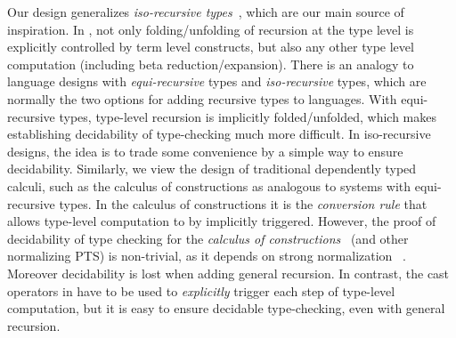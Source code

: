 Our design generalizes \emph{iso-recursive
  types}~\cite{tapl}, which are our main source of inspiration. 
In \name, not only folding/unfolding of
recursion at the type level is explicitly controlled by term level
constructs, but also any other type level computation (including beta
reduction/expansion). There is an analogy to language designs with
\emph{equi-recursive} types and \emph{iso-recursive} types, which are
normally the two options for adding recursive types to languages. With
equi-recursive types, type-level recursion is implicitly
folded/unfolded, which makes establishing decidability of
type-checking much more difficult. In iso-recursive designs, the idea is to 
trade some convenience by a simple way to ensure decidability. 
Similarly, we view the design of traditional dependently typed
calculi, such as the calculus of constructions as analogous 
to systems with equi-recursive types. In the calculus of constructions 
it is the \emph{conversion rule} that allows type-level computation to 
by implicitly triggered. However, the proof of decidability
of type checking for the \emph{calculus of constructions}~\cite{coc}
(and other normalizing PTS) is non-trivial, as it depends on strong normalization
~\cite{pts:normalize}. Moreover decidability is lost when adding
general recursion. In contrast, the cast operators in \name have to be used 
to \emph{explicitly} trigger each step of type-level computation, but 
it is easy to ensure decidable type-checking, even with general recursion. 

